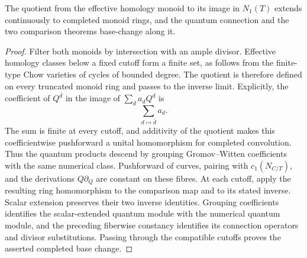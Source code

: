 \begin{lemma}
\label{lem:numerical-base-change}
%
%
The quotient from the effective homology monoid to its image in \(N_1(T)\)
extends continuously to completed monoid rings, and the quantum connection
and the two comparison theorems base-change along it.
\end{lemma}

\begin{proof}
Filter both monoids by intersection with an ample divisor.  Effective homology
classes below a fixed cutoff form a finite set, as follows from the finite-type
Chow varieties of cycles of bounded degree.  The quotient is therefore defined
on every truncated monoid ring and passes to the inverse limit.  Explicitly,
the coefficient of \(Q^{\bar d}\) in the image of \(\sum_da_dQ^d\) is
\[
 \sum_{d\mapsto\bar d}a_d.
\]
The sum is finite at every cutoff, and additivity of the quotient makes this
coefficientwise pushforward a unital homomorphism for completed convolution.
Thus the quantum products descend by grouping Gromov--Witten coefficients with
the same numerical class.  Pushforward of curves, pairing with
\(c_1(N_{C/T})\), and the derivations \(Q\partial_Q\) are constant on these
fibres.  At each cutoff, apply the resulting ring homomorphism to the
comparison map and to its stated inverse.  Scalar extension preserves their
two inverse identities.  Grouping coefficients identifies the scalar-extended
quantum module with the numerical quantum module, and the preceding
fiberwise constancy identifies its connection operators and divisor
substitutions.  Passing through the compatible cutoffs proves the asserted
completed base change.
\end{proof}

